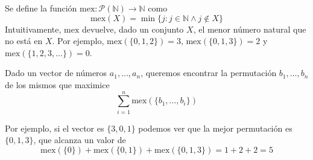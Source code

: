 Se define la función $\text{mex} : \mathcal{P}(\mathbb{N}) \rightarrow \mathbb{N}$ como
\[\text{mex}(X) = \min\{j : j \in \mathbb{N} \land j \notin X\}\]
Intuitivamente, $\text{mex}$ devuelve, dado un conjunto $X$, el menor número natural que no está en $X$.
Por ejemplo, $\text{mex}(\{0, 1, 2\}) = 3$, $\text{mex}(\{0, 1, 3\}) = 2$ y $\text{mex}(\{1, 2, 3, \ldots\}) = 0$.

Dado un vector de números $a_1, \ldots, a_n$, queremos encontrar la permutación $b_1, \ldots, b_n$ de los mismos que maximice
\[\sum_{i=1}^{n} \text{mex}(\{b_1, \ldots, b_i\})\]

Por ejemplo, si el vector es $\{3, 0, 1\}$ podemos ver que la mejor permutación es $\{0, 1, 3\}$, que alcanza un valor de
\[\text{mex}(\{0\}) + \text{mex}(\{0, 1\}) + \text{mex}(\{0, 1, 3\}) = 1 + 2 + 2 = 5\]

